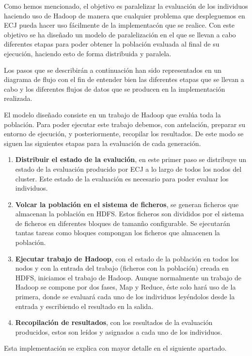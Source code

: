 Como hemos mencionado, el objetivo es paralelizar la evaluaci\'on de los individuos haciendo uso de Hadoop de manera que cualquier problema que despleguemos en ECJ pueda hacer uso fácilmente de la implementac\'on que se realice. Con este objetivo se ha dise\~nado un modelo de paralelizaci\'on en el que se llevan a cabo diferentes etapas para poder obtener la poblaci\'on evaluada al final de su ejecuci\'on, haciendo esto de forma distribuida y paralela.

Los pasos que se describir\'an a continuaci\'on han sido representados en un diagrama de flujo  con el fin de entender bien las diferentes etapas que se llevan a cabo y los diferentes flujos de datos que se producen en la implementaci\'on realizada.


El modelo dise\~nado consiste en un trabajo de Hadoop que eval\'ua toda la población. Para poder ejecutar este trabajo debemos, con antelaci\'on, preparar su entorno de ejecuci\'on, y posteriormente, recopilar los resultados. De este modo se siguen las siguientes etapas para la evaluaci\'on de cada generaci\'on.

\begin{enumerate}
	\item \textbf{Distribuir el estado de la evaluci\'on}, en este primer paso se distribuye un estado de la evaluaci\'on producido por ECJ a lo largo de todos los nodos del cluster. Este estado de la evaluaci\'on es necesario para poder evaluar los individuos.
	\item \textbf{Volcar la poblaci\'on en el sistema de ficheros}, se generan ficheros que almacenan la poblaci\'on en HDFS. Estos ficheros son divididos por el sistema de ficheros en diferentes bloques de taman\~no configurable. Se ejecutar\'an tantas tareas como bloques compongan los ficheros que almacenen la poblaci\'on.
	\item \textbf{Ejecutar trabajo de Hadoop}, con el estado de la poblaci\'on en todos los nodos y con la entrada del trabajo (ficheros con la poblaci\'on) creada en HDFS, iniciamos el trabajo de Hadoop. Aunque normalmente un trabajo de Hadoop se compone por dos fases, Map y Reduce, \'este solo har\'a uso de la primera, donde se evaluar\'a cada uno de los individuos leyéndolos desde la entrada y escribiendo el resultado en la salida.
	\item \textbf{Recopilaci\'on de resultados}, con los resultados de la evaluaci\'on producidos, estos son leídos y asignados a cada uno de los individuos.
\end{enumerate}

Esta implementación se explica con mayor detalle en el siguiente apartado. 